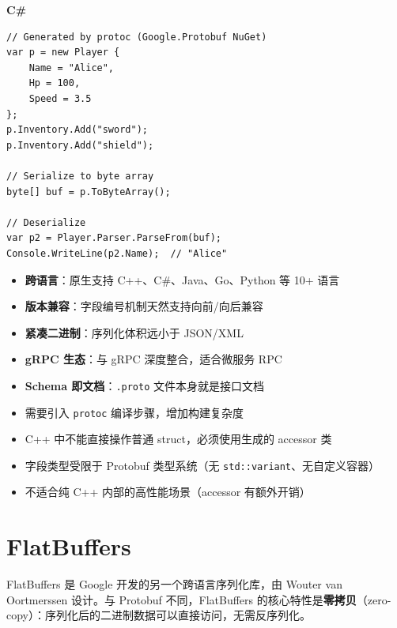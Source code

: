 \documentclass[12pt,a4paper,fontset=fandol]{ctexbook}
\newcommand{\Tp}[1]{\texttt{#1}}
\newcommand{\csharplabel}{%
  \noindent\begin{tcolorbox}[colback=csharpheadbg,coltext=white,
    sharp corners,boxrule=0pt,width=3.2em,height=1.4em,
    halign=center,valign=center,nobeforeafter,left=0pt,right=0pt,
    top=0pt,bottom=0pt]\small\bfseries C\#\end{tcolorbox}}
\begin{document}
\csharplabel
\begin{lstlisting}[style=csharpstyle,caption={Protocol Buffers: C\# 使用 Google.Protobuf}]
// Generated by protoc (Google.Protobuf NuGet)
var p = new Player {
    Name = "Alice",
    Hp = 100,
    Speed = 3.5
};
p.Inventory.Add("sword");
p.Inventory.Add("shield");

// Serialize to byte array
byte[] buf = p.ToByteArray();

// Deserialize
var p2 = Player.Parser.ParseFrom(buf);
Console.WriteLine(p2.Name);  // "Alice"
\end{lstlisting}

\begin{guideline}[title={Protobuf 核心优势}]
\begin{itemize}[nosep]
  \item \textbf{跨语言}：原生支持 C++、C\#、Java、Go、Python 等 10+ 语言
  \item \textbf{版本兼容}：字段编号机制天然支持向前/向后兼容
  \item \textbf{紧凑二进制}：序列化体积远小于 JSON/XML
  \item \textbf{gRPC 生态}：与 gRPC 深度整合，适合微服务 RPC
  \item \textbf{Schema 即文档}：\texttt{.proto} 文件本身就是接口文档
\end{itemize}
\end{guideline}

\begin{note}[title={Protobuf 的代价}]
\begin{itemize}[nosep]
  \item 需要引入 \texttt{protoc} 编译步骤，增加构建复杂度
  \item C++ 中不能直接操作普通 struct，必须使用生成的 accessor 类
  \item 字段类型受限于 Protobuf 类型系统（无 \Tp{std::variant}、无自定义容器）
  \item 不适合纯 C++ 内部的高性能场景（accessor 有额外开销）
\end{itemize}
\end{note}

\chapter{FlatBuffers}\label{ch:flatbuffers}

FlatBuffers 是 Google 开发的另一个跨语言序列化库，由 Wouter van Oortmerssen 设计。与 Protobuf 不同，FlatBuffers 的核心特性是\textbf{零拷贝}（zero-copy）：序列化后的二进制数据可以直接访问，无需反序列化。
\end{document}
